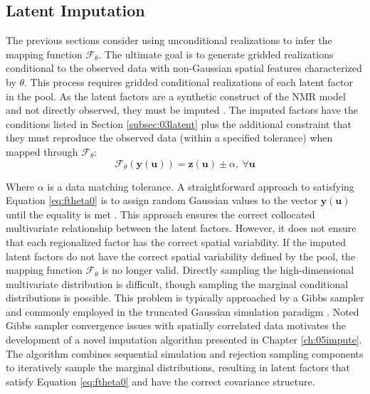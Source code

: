 \FloatBarrier
\subsection{Latent Imputation}
\label{subsec:03impute}

The previous sections consider using unconditional realizations to infer the mapping function $\mathcal{F}_{\theta}$. The ultimate goal is to generate gridded realizations conditional to the observed data with non-Gaussian spatial features characterized by $\theta$. This process requires gridded conditional realizations of each latent factor in the pool. As the latent factors are a synthetic construct of the \gls{NMR} model and not directly observed, they must be imputed \citep{little2019statistical}. The imputed factors have the conditions listed in Section \ref{subsec:03latent} plus the additional constraint that they must reproduce the observed data (within a specified tolerance) when mapped through $\mathcal{F}_{\theta}$:
\begin{equation}
    \mathcal{F}_{\theta}(\mathbf{y}(\mathbf{u})) = \mathbf{z}(\mathbf{u}) \pm \alpha, \ \forall \mathbf{u}
    \label{eq:ftheta0}
\end{equation}

Where $\alpha$ is a data matching tolerance. A straightforward approach to satisfying Equation \ref{eq:ftheta0} is to assign random Gaussian values to the vector $\mathbf{y}(\mathbf{u})$ until the equality is met \citep{silva2018enhanced}. This approach ensures the correct collocated multivariate relationship between the latent factors. However, it does not ensure that each regionalized factor has the correct spatial variability. If the imputed latent factors do not have the correct spatial variability defined by the pool, the mapping function $\mathcal{F}_{\theta}$ is no longer valid. Directly sampling the high-dimensional multivariate distribution is difficult, though sampling the marginal conditional distributions is possible. This problem is typically approached by a Gibbs sampler \citep{geman1984stochastic} and commonly employed in the truncated Gaussian simulation paradigm \citep{arroyo2020iterative,madani2021enhanced}. Noted Gibbs sampler convergence issues with spatially correlated data motivates the development of a novel imputation algorithm presented in Chapter \ref{ch:05impute}. The algorithm combines sequential simulation and rejection sampling components to iteratively sample the marginal distributions, resulting in latent factors that satisfy Equation \ref{eq:ftheta0} and have the correct covariance structure.

